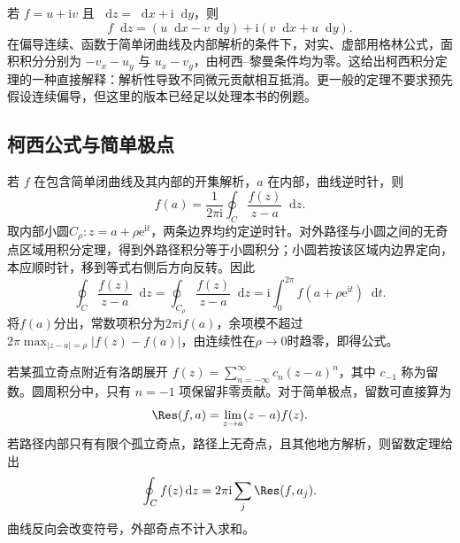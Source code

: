 \documentclass[11pt,openany,fontset=fandol]{ctexbook}
\theoremstyle{plain}\newtheorem{theorem}{定理}[chapter]\newtheorem{proposition}[theorem]{命题}
\theoremstyle{definition}\newtheorem{definition}{定义}[chapter]\newtheorem{example}{例}[chapter]
\theoremstyle{remark}\newtheorem*{remark}{说明}
\newcommand{\dd}{\mathop{}\!\mathrm d}\newcommand{\ii}{\mathrm i}\newcommand{\ee}{\mathrm e}
\begin{document}
若 $f=u+\ii v$ 且 $\dd z=\dd x+\ii\dd y$，则
\[
f\dd z=(u\dd x-v\dd y)+\ii(v\dd x+u\dd y).
\]
在偏导连续、函数于简单闭曲线及内部解析的条件下，对实、虚部用格林公式，面积积分分别为 $-v_x-u_y$ 与 $u_x-v_y$，由柯西--黎曼条件均为零。这给出柯西积分定理的一种直接解释：解析性导致不同微元贡献相互抵消。更一般的定理不要求预先假设连续偏导，但这里的版本已经足以处理本书的例题。

\subsection{柯西公式与简单极点}
若 $f$ 在包含简单闭曲线及其内部的开集解析，$a$ 在内部，曲线逆时针，则
\begin{equation}
f(a)=\frac1{2\pi\ii}\oint_C\frac{f(z)}{z-a}\dd z.
\end{equation}
取内部小圆$C_\rho:z=a+\rho\ee^{\ii t}$，两条边界均约定逆时针。对外路径与小圆之间的无奇点区域用积分定理，得到外路径积分等于小圆积分；小圆若按该区域内边界定向，本应顺时针，移到等式右侧后方向反转。因此
\[\oint_C\frac{f(z)}{z-a}\dd z
=\oint_{C_\rho}\frac{f(z)}{z-a}\dd z
=\ii\int_0^{2\pi}f(a+\rho\ee^{\ii t})\dd t.\]
将$f(a)$分出，常数项积分为$2\pi\ii f(a)$，余项模不超过
$2\pi\max_{|z-a|=\rho}|f(z)-f(a)|$，由连续性在$\rho\to0$时趋零，即得公式。

若某孤立奇点附近有洛朗展开 $f(z)=\sum_{n=-\infty}^{\infty}c_n(z-a)^n$，其中 $c_{-1}$ 称为留数。圆周积分中，只有 $n=-1$ 项保留非零贡献。对于简单极点，留数可直接算为
\begin{equation}
\Res(f,a)=\lim_{z\to a}(z-a)f(z).
\end{equation}
若路径内部只有有限个孤立奇点，路径上无奇点，且其他地方解析，则留数定理给出
\begin{equation}
\oint_C f(z)\dd z=2\pi\ii\sum_j\Res(f,a_j).
\end{equation}
曲线反向会改变符号，外部奇点不计入求和。
\end{document}
